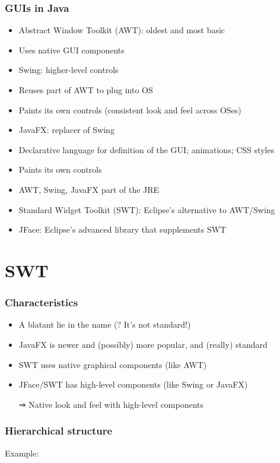 \documentclass[french, english]{beamer}
\begin{document}
\begin{frame}
	\frametitle{GUIs in Java}
	\begin{itemize}
		\item Abstract Window Toolkit (AWT): oldest and most basic
		\item Uses native GUI components
		\item Swing: higher-level controls
		\item Reuses part of AWT to plug into OS
		\item Paints its own controls (consistent look and feel across OSes)
		\item JavaFX: replacer of Swing
		\item Declarative language for definition of the GUI; animations; CSS styles
		\item Paints its own controls
		\item AWT, Swing, JavaFX part of the JRE
		\item Standard Widget Toolkit (SWT): Eclipse’s alternative to AWT/Swing
		\item JFace: Eclipse’s advanced library that supplements SWT
	\end{itemize}
\end{frame}

\section{SWT}
\begin{frame}
	\frametitle{Characteristics}
	\begin{itemize}
		\item A blatant lie in the name (? \pause It’s not standard!)
		\item JavaFX is newer and (possibly) more popular, and (really) standard
		\item SWT uses native graphical components (like AWT)
		\item JFace/SWT has high-level components (like Swing or JavaFX)
		\item[⇒] Native look and feel with high-level components
	\end{itemize}
\end{frame}

\begin{frame}[fragile]
	\frametitle{Hierarchical structure}
	Example:
	\footnotesize
\end{frame}
\end{document}
